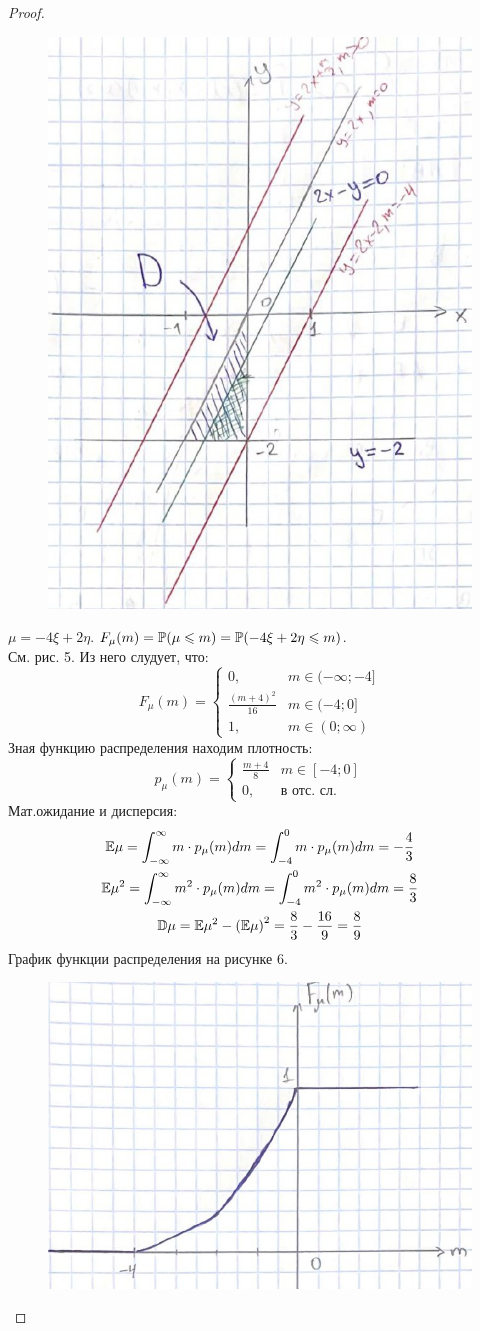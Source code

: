 \begin{proof}
\begin{figure}[h!]
    \centering
    \includegraphics[width=0.5\linewidth]{5.jpeg}
    \caption{}
    \label{fig:enter-label}
\end{figure}
$\mu = -4\xi + 2\eta$. $F_{\mu}(m) = \mathbb P(\mu \leqslant m) = \mathbb P(-4\xi + 2\eta\leqslant m)$.\\
См. рис. 5. Из него слудует, что: 
\[
F_{\mu}(m) = \begin{cases}
    0, & m\in (-\infty;-4]\\
    \frac{(m + 4)^2}{16}& m\in (-4; 0]\\
    1, & m\in (0; \infty)
\end{cases}
\]
Зная функцию распределения находим плотность:
\[
p_{\mu}(m) = \begin{cases}
    \frac{m + 4}{8}& m\in [-4; 0]\\
    0, & \text{в отс. сл.}
\end{cases}
\]
Мат.ожидание и дисперсия:
\begin{gather*}
    \mathbb E\mu = \int_{-\infty}^{\infty}m\cdot p_{\mu}(m)dm = \int_{-4}^{0}m\cdot p_{\mu}(m)dm = -\frac{4}{3}\\
    \mathbb E\mu^2 = \int_{-\infty}^{\infty}m^2\cdot p_{\mu}(m)dm = \int_{-4}^{0}m^2\cdot p_{\mu}(m)dm = \frac{8}{3}\\
    \mathbb D\mu = \mathbb E\mu^2 - \left(\mathbb E\mu\right)^2 = \frac{8}{3} - \frac{16}{9} = \frac{8}{9}
\end{gather*}
График функции распределения на рисунке 6.
\begin{figure}[h!]
    \centering
    \includegraphics[width=0.5\linewidth]{6.jpeg}
    \caption{}
    \label{fig:enter-label}
\end{figure}
\end{proof}